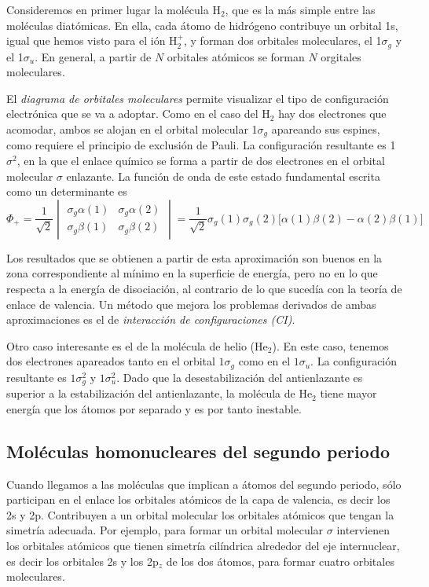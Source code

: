 Consideremos en primer lugar la molécula H$_2$, que es la más
simple entre las moléculas diatómicas. En ella, cada átomo de
hidrógeno contribuye un orbital 1s, igual que hemos visto para
el ión H$_2^+$, y forman dos orbitales moleculares, el 
1$\sigma_g$ y el 1$\sigma_u$. En general, a partir de $N$ 
orbitales atómicos se forman $N$ orgitales moleculares.

El \textit{diagrama de orbitales moleculares} 
permite visualizar el tipo de configuración electrónica que se
va a adoptar. Como en el caso del H$_2$ hay dos electrones
que acomodar, ambos se alojan en el orbital molecular 1$\sigma_g$
apareando sus espines, como requiere el principio de exclusión
de Pauli. La configuración resultante es 1$\sigma^2$, en la
que el enlace químico se forma a partir de dos electrones en el
orbital molecular $\sigma$ enlazante. La función de onda de 
este estado fundamental escrita como un determinante es
\begin{equation}
   \Phi_+ =
   \frac{1}{\sqrt{2}}
   \begin{vmatrix}
\sigma_g\alpha(1) & \sigma_g\alpha(2) \\ 
\sigma_g\beta(1) & \sigma_g\beta(2) 
\end{vmatrix}=
\frac{1}{\sqrt{2}}\sigma_g(1)\sigma_g(2)\big[\alpha(1)\beta(2)-\alpha(2)\beta(1)\big]
\end{equation}

Los resultados que se obtienen a partir de esta aproximación 
son buenos en la zona correspondiente al mínimo en la superficie
de energía, pero no
en lo que respecta a la energía de disociación, al contrario
de lo que sucedía con la teoría de enlace de valencia.
Un método que mejora los problemas derivados de ambas 
aproximaciones es el de \textit{interacción de configuraciones (CI)}.

Otro caso interesante es el de la molécula de helio (He$_2$). 
En este caso, tenemos dos electrones apareados tanto en
el orbital $1\sigma_g$ como en el $1\sigma_u$. La configuración
resultante es $1\sigma_g^2$ y $1\sigma_u^2$. Dado que la 
desestabilización del antienlazante es superior a la
estabilización del antienlazante, la molécula de He$_2$ 
tiene mayor energía que los átomos por separado y es por
tanto inestable.

\subsection{Moléculas homonucleares del segundo periodo}
Cuando llegamos a las moléculas que implican a átomos del
segundo periodo, sólo participan en el enlace los orbitales
atómicos de la capa de valencia, es decir los 2s y 2p.
Contribuyen a un orbital molecular los orbitales atómicos
que tengan la simetría adecuada. Por ejemplo, para formar
un orbital molecular $\sigma$ intervienen los orbitales
atómicos que tienen simetría cilíndrica alrededor del eje
internuclear, es decir los orbitales 2s y los 2p$_z$ de 
los dos átomos, para formar cuatro orbitales moleculares.

